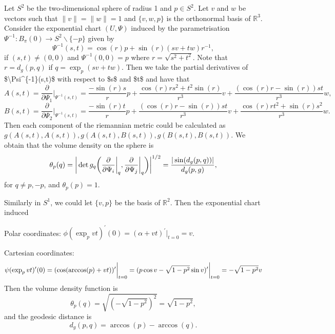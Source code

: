 \documentclass[11pt,a4paper,]{article}
\begin{document}
Let \(S^2\) be the two-dimensional sphere of radius 1 and \(p \in S^2\). Let
\(v\) and \(w\) be vectors such that \(\|v\| = \|w\| = 1\) and \(\{v, w, p\}\)
is the orthonormal basis of \(\mathbb{R}^3\). Consider the exponential
chart \((U, \Psi)\) induced by the parametrisation
\(\Psi^{-1}: B_\pi(0) \rightarrow S^2 \backslash \{-p\}\) given by \[
\Psi^{-1}(s,t) = \cos(r)p + \sin(r)(sv+tw)r^{-1},
\] if \((s,t) \neq (0,0)\) and \(\Psi^{-1}(0,0)=p\) where
\(r=\sqrt{s^2 + t^2}\). Note that \(r=d_g(p,q)\) if \(q = \exp_p(sv+tw)\).
Then we take the partial derivatives of \$\textbackslash Psi\^{}\{-1\}(s,t)\$ with
respect to \$s\$ and \$t\$ and have that
\[
A(s,t) = \frac{\partial}{\partial \Psi_1} \bigg|_{\Psi^{-1}(s,t)} = \frac{-\sin{(r)}s}{r}p + \frac{\cos(r)rs^2+t^2\sin(r)}{r^3}v + \frac{(\cos(r)r-\sin(r))st}{r^3}w,
\]
\[
B(s,t) = \frac{\partial}{\partial \Psi_2} \bigg|_{\Psi^{-1}(s,t)} = \frac{-\sin{(r)}t}{r}p + \frac{(\cos(r)r-\sin(r))st}{r^3}v + \frac{\cos(r)rt^2+\sin(r)s^2}{r^3}w.
\]
Then each component of the riemannian metric could be calculated as
\(g(A(s,t), A(s,t)), g(A(s,t), B(s,t)), g(B(s,t), B(s,t))\). We obtain
that the volume density on the sphere is \[
\theta_p(q) = \bigg| \det g_q\bigg( \frac{\partial}{\partial \Psi_i}\bigg|_q, \frac{\partial}{\partial \Psi_j}\bigg|_q \bigg) \bigg|^{1/2} \\
= \frac{|\sin(d_g(p,q))|}{d_g(p,g)},
\] for \(q \neq p, -p\), and \(\theta_p(p) = 1\).

Similarly in \(S^1\), we could let \(\{v, p\}\) be the basis of
\(\mathbb{R}^2\). Then the exponential chart induced

Polar coordinates:
\(\phi(\exp_p{vt})^{\prime}(0) = (\alpha + vt)^\prime\bigg|_{t=0} = v\).

Cartesian coordinates:
\[
\psi(\exp_p{vt})^{\prime}(0) = (\cos(\arccos(p)+vt))^\prime\bigg|_{t=0} \\
= (p \cos{v} - \sqrt{1-p^2} \sin{v})^\prime \bigg|_{t=0} \\
= - \sqrt{1 - p^2}v
\]
Then the volume density function is
\[
\theta_p(q) = \sqrt{(-\sqrt{1-p^2})^2} = \sqrt{1-p^2},
\]
and the geodesic distance is
\[
d_g(p,q) = \arccos(p) - \arccos(q).
\]

\printbibliography
\end{document}
